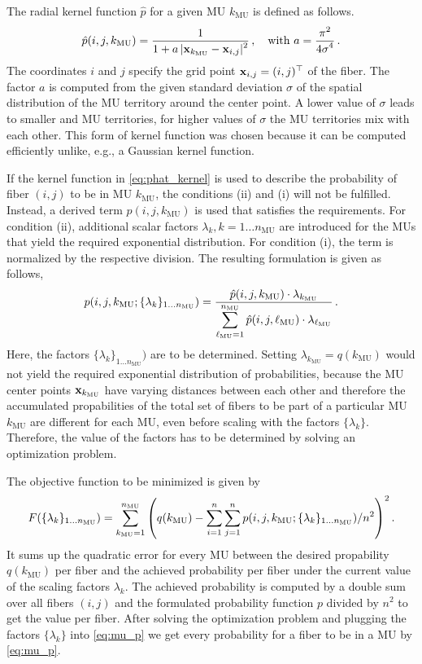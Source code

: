The radial kernel function $\hat{p}$ for a given MU $k_\text{MU}$ is defined as follows.
\begin{align}\label{eq:phat_kernel}
  \hat{p}(i,j,k_\text{MU}) = \displaystyle\frac{\displaystyle{1}}{\displaystyle{1 + a\,\vert\textbf{x}_{k_\text{MU}} - \textbf{x}_{i,j}\vert^2}}\,, \quad \text{with }a = \displaystyle\frac{\displaystyle{\pi^2}}{\displaystyle{4\sigma^4}}\,.
\end{align}
The coordinates $i$ and $j$ specify the grid point $\textbf{x}_{i,j} = (i,j)^\top$ of the fiber. The factor $a$ is computed from the given standard deviation $\sigma$ of the spatial distribution of the MU territory around the center point. A lower value of $\sigma$ leads to smaller and  MU territories, for higher values of $\sigma$ the MU territories mix with each other.
This form of kernel function was chosen because it can be computed efficiently unlike, e.g., a Gaussian kernel function.

If the kernel function in \cref{eq:phat_kernel} is used to describe the probability of fiber $(i,j)$ to be in MU $k_\text{MU}$, the conditions (ii) and (i) will not be fulfilled. Instead, a derived term $p(i,j,k_\text{MU})$ is used that satisfies the requirements.
For condition (ii), additional scalar factors $\lambda_k, k=1\dots n_\text{MU}$ are introduced for the MUs that yield the required exponential distribution.
For condition (i), the term is normalized by the respective division. The resulting formulation is given as follows,
\begin{align}\label{eq:mu_p}
  p(i,j,k_\text{MU};\{\lambda_k\}_{1\dots n_\text{MU}}) = \displaystyle\frac{\displaystyle{\hat{p}(i,j,k_\text{MU}) \cdot \lambda_{k_\text{MU}}}}{\displaystyle{\displaystyle\sum\limits_{\ell_\text{MU}=1}^{n_\text{MU}} \hat{p}(i,j,\ell_\text{MU}) \cdot \lambda_{\ell_\text{MU}}}}\,.
\end{align}
Here, the factors $\{\lambda_k\}_{1\dots n_\text{MU}})$ are to be determined. Setting $\lambda_{k_\text{MU}} = q(k_\text{MU})$ would not yield the required exponential distribution of probabilities, because the MU center points $\textbf{x}_{k_\text{MU}}$ have varying distances between each other and therefore the accumulated propabilities of the total set of fibers to be part of a particular MU $k_\text{MU}$ are different for each MU, even before scaling with the factors $\{\lambda_k\}$.
Therefore, the value of the factors has to be determined by solving an optimization problem.

The objective function to be minimized is given by%
\begin{align}\label{eq:mus_objective}
  F(\{\lambda_k\}_{1\dots n_\text{MU}}) = \displaystyle\sum\limits_{k_\text{MU}=1}^{n_\text{MU}} \left(q(k_\text{MU}) - \displaystyle\sum\limits_{i=1}^{n}\displaystyle\sum\limits_{j=1}^{n}p(i,j,k_\text{MU};\{\lambda_k\}_{1\dots n_\text{MU}}) / n^2\right)^2.
\end{align}
It sums up the quadratic error for every MU between the desired propability $q(k_\text{MU})$ per fiber and the achieved probability per fiber under the current value of the scaling factors $\lambda_k$. The achieved probability is computed by a double sum over all fibers $(i,j)$ and the formulated probability function $p$ divided by $n^2$ to get the value per fiber.
After solving the optimization problem and plugging the factors $\{\lambda_k\}$ into \cref{eq:mu_p} we get every probability for a fiber to be in a MU by \cref{eq:mu_p}.

